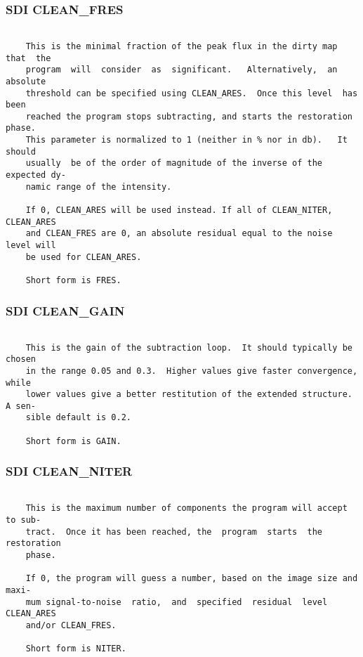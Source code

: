 \subsubsection{SDI CLEAN\_FRES}
\begin{verbatim}

    This is the minimal fraction of the peak flux in the dirty map that  the
    program  will  consider  as  significant.   Alternatively,  an  absolute
    threshold can be specified using CLEAN_ARES.  Once this level  has  been
    reached the program stops subtracting, and starts the restoration phase.
    This parameter is normalized to 1 (neither in % nor in db).   It  should
    usually  be of the order of magnitude of the inverse of the expected dy-
    namic range of the intensity.

    If 0, CLEAN_ARES will be used instead. If all of CLEAN_NITER, CLEAN_ARES
    and CLEAN_FRES are 0, an absolute residual equal to the noise level will
    be used for CLEAN_ARES.

    Short form is FRES.

\end{verbatim}
\subsubsection{SDI CLEAN\_GAIN}
\begin{verbatim}

    This is the gain of the subtraction loop.  It should typically be chosen
    in the range 0.05 and 0.3.  Higher values give faster convergence, while
    lower values give a better restitution of the extended structure. A sen-
    sible default is 0.2.

    Short form is GAIN.

\end{verbatim}
\subsubsection{SDI CLEAN\_NITER}
\begin{verbatim}

    This is the maximum number of components the program will accept to sub-
    tract.  Once it has been reached, the  program  starts  the  restoration
    phase.

    If 0, the program will guess a number, based on the image size and maxi-
    mum signal-to-noise  ratio,  and  specified  residual  level  CLEAN_ARES
    and/or CLEAN_FRES.

    Short form is NITER.

\end{verbatim}

